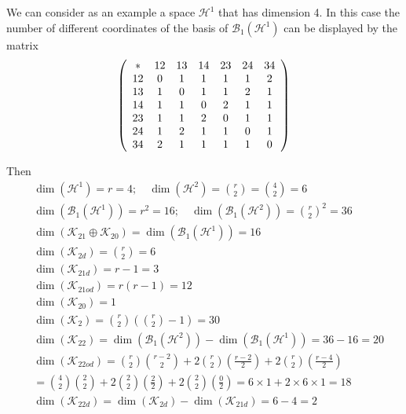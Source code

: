 \documentclass[aps,preprint]{revtex4}%
\begin{document}
We can consider as an example a space $\mathcal{H}^{1}$ that has dimension 4.
In this case the number of different coordinates of the basis of
$\mathcal{B}_{1}\left(  \mathcal{H}^{1}\right)  $ can be displayed by the
matrix
\begin{equation}
\left(
\begin{array}
[c]{ccccccc}%
\ast & 12 & 13 & 14 & 23 & 24 & 34\\
12 & 0 & 1 & 1 & 1 & 1 & 2\\
13 & 1 & 0 & 1 & 1 & 2 & 1\\
14 & 1 & 1 & 0 & 2 & 1 & 1\\
23 & 1 & 1 & 2 & 0 & 1 & 1\\
24 & 1 & 2 & 1 & 1 & 0 & 1\\
34 & 2 & 1 & 1 & 1 & 1 & 0
\end{array}
\right)
\end{equation}


Then
\begin{align}
&  \dim\left(  \mathcal{H}^{1}\right)  =r=4;\quad\dim\left(  \mathcal{H}%
^{2}\right)  =\binom{r}{2}=\binom{4}{2}=6\nonumber\\
&  \dim\left(  \mathcal{B}_{1}\left(  \mathcal{H}^{1}\right)  \right)
=r^{2}=16;\quad\dim\left(  \mathcal{B}_{1}\left(  \mathcal{H}^{2}\right)
\right)  =\binom{r}{2}^{2}=36\nonumber\\
&  \dim\left(  \mathcal{K}_{21}\oplus\mathcal{K}_{20}\right)  =\dim\left(
\mathcal{B}_{1}\left(  \mathcal{H}^{1}\right)  \right)  =16\nonumber\\
&  \dim\left(  \mathcal{K}_{2d}\right)  =\binom{r}{2}=6\nonumber\\
&  \dim\left(  \mathcal{K}_{21d}\right)  =r-1=3\nonumber\\
&  \dim\left(  \mathcal{K}_{21od}\right)  =r\left(  r-1\right)  =12\nonumber\\
&  \dim\left(  \mathcal{K}_{20}\right)  =1\nonumber\\
&  \dim\left(  \mathcal{K}_{2}\right)  =\binom{r}{2}\left(  \binom{r}%
{2}-1\right)  =30\nonumber\\
&  \dim\left(  \mathcal{K}_{22}\right)  =\dim\left(  \mathcal{B}_{1}\left(
\mathcal{H}^{2}\right)  \right)  -\dim\left(  \mathcal{B}_{1}\left(
\mathcal{H}^{1}\right)  \right)  =36-16=20\nonumber\\
&  \dim\left(  \mathcal{K}_{22od}\right)  =\binom{r}{2}\binom{r-2}{2}%
+2\binom{r}{2}\left(  \frac{r-2}{2}\right)  +2\binom{r}{2}\left(  \frac
{r-4}{2}\right) \nonumber\\
&  =\binom{4}{2}\binom{2}{2}+2\binom{2}{2}\left(  \frac{2}{2}\right)
+2\binom{2}{2}\left(  \frac{0}{2}\right)  =6\times1+2\times6\times
1=18\nonumber\\
&  \dim\left(  \mathcal{K}_{22d}\right)  =\dim\left(  \mathcal{K}_{2d}\right)
-\dim\left(  \mathcal{K}_{21d}\right)  =6-4=2
\end{align}
\end{document}
